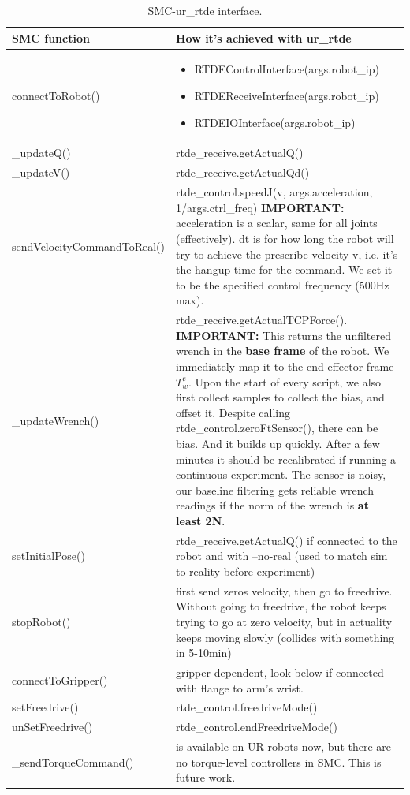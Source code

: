 \begin{table}[h!]
		\centering
		\label{table-smc-ur-rtde-interface}
		\begin{tabular}{p{4.5cm} | p{8cm}}
				\textbf{SMC function} & \textbf{How it's achieved with ur\_rtde} \\
				\hline
				connectToRobot() & \begin{itemize}
						\item RTDEControlInterface(args.robot\_ip)
						\item RTDEReceiveInterface(args.robot\_ip)
						\item RTDEIOInterface(args.robot\_ip)
				\end{itemize} \\
				\hline
\_updateQ() & rtde\_receive.getActualQ() \\
				\hline
\_updateV() & rtde\_receive.getActualQd() \\ 
				\hline
sendVelocityCommandToReal() & rtde\_control.speedJ(v, args.acceleration, 1/args.ctrl\_freq)
\newline
\textbf{IMPORTANT:} acceleration is a scalar, same for all joints (effectively).
dt is for how long the robot will try to achieve the prescribe velocity v,
i.e. it's the hangup time for the command. 
We set it to be the specified control frequency (500Hz max).\\
				\hline
\_updateWrench() & rtde\_receive.getActualTCPForce(). 
\newline
\textbf{IMPORTANT:} This returns the unfiltered wrench in the \textbf{base frame} of 
the robot. We immediately map it to the end-effector frame $ T_{ w }^{ e }  $.
Upon the start of every script, we also first collect samples to collect the bias,
and offset it. Despite calling rtde\_control.zeroFtSensor(), there can be bias.
And it builds up quickly. After a few minutes it should be recalibrated
if running a continuous experiment.
The sensor is noisy, our baseline filtering gets reliable wrench readings
if the norm of the wrench is \textbf{at least 2N}.\\
setInitialPose() & rtde\_receive.getActualQ() if connected to the robot
and with --no-real (used to match sim to reality before experiment)\\
				\hline
stopRobot() & first send zeros velocity, then go to freedrive. 
Without going to freedrive, the robot keeps trying to go at zero velocity,
but in actuality keeps moving slowly (collides with something in 5-10min)\\
				\hline
connectToGripper() & gripper dependent, look below if connected with flange to arm's wrist.\\
				\hline
setFreedrive() & rtde\_control.freedriveMode() \\
				\hline
unSetFreedrive() & rtde\_control.endFreedriveMode() \\
				\hline
\_sendTorqueCommand() & is available on UR robots now, but there are
no torque-level controllers in SMC. This is future work.
		\end{tabular}
		\caption{SMC-ur\_rtde interface.}
\end{table}

